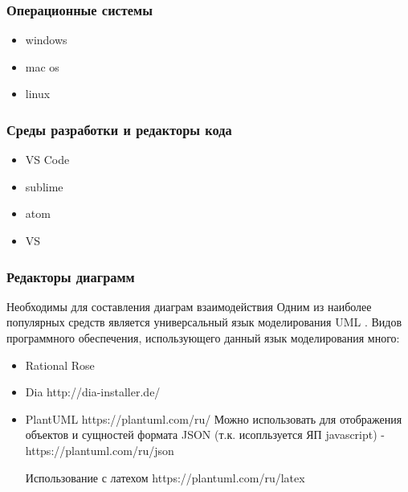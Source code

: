     \subsubsection{Операционные системы}                                                        %
        \begin{itemize}
            \item windows
            \item mac os
            \item linux
        \end{itemize}
        
    \subsubsection{Среды разработки и редакторы кода}                                             %
        \begin{itemize}
            \item VS Code
            \item sublime
            \item atom
            \item VS
        \end{itemize}
    
    \subsubsection{Редакторы диаграмм}                                                %
        Необходимы для составления диаграм взаимодействия
        Одним из наиболее популярных средств является универсальный язык моделирования UML \cite{wiki-UML}.
        Видов программного обеспечения, использующего данный язык моделирования много:
        \begin{itemize}
            \item Rational Rose
            \item Dia   http://dia-installer.de/
            \item PlantUML  https://plantuml.com/ru/
            Можно использовать для отображения объектов и сущностей формата JSON (т.к. исопльзуется ЯП javascript) - https://plantuml.com/ru/json

            Использование с латехом
            https://plantuml.com/ru/latex

        \end{itemize}


